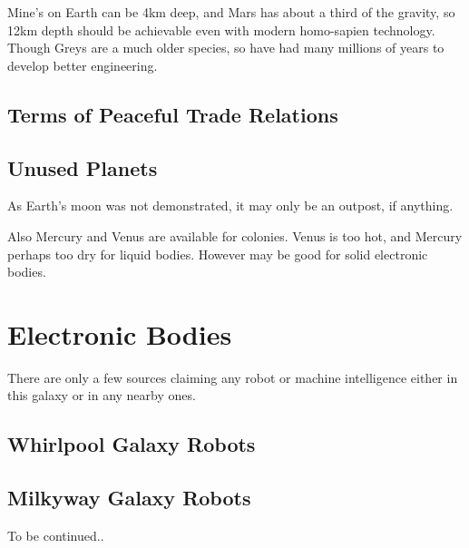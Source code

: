 \documentclass{report}
\begin{document}
Mine's on Earth can be 4km deep, and Mars has about a third of the gravity, so
12km depth should be achievable even with modern homo-sapien technology. Though
Greys are a much older species, so have had many millions of years to develop
better engineering.

\subsection{Terms of Peaceful Trade Relations}


\subsection{Unused Planets}

As Earth's moon was not demonstrated, it may only be an outpost, if anything.

Also Mercury and Venus are available for colonies. Venus is too hot, and Mercury
perhaps too dry for liquid bodies. However may be good for solid electronic
bodies. 



\section{Electronic Bodies}

There are only a few sources claiming any robot or machine intelligence either
in this galaxy or in any nearby ones.

\subsection{Whirlpool Galaxy Robots}

\subsection{Milkyway Galaxy Robots}


To be continued..

%
\end{document}
